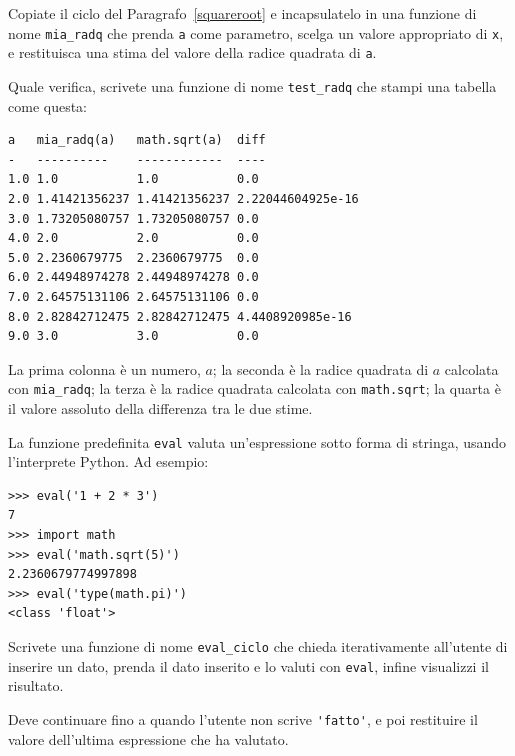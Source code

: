 \documentclass[10pt]{book}
\begin{document}
\begin{exercise}

Copiate il ciclo del Paragrafo~\ref{squareroot} e incapsulatelo in una funzione
di nome \verb"mia_radq" che prenda {\tt a} come parametro, scelga un valore appropriato di {\tt x}, e restituisca una stima del valore della radice quadrata di {\tt a}.  

Quale verifica, scrivete una funzione di nome \verb"test_radq" che stampi una tabella come questa:

\begin{verbatim}
a   mia_radq(a)   math.sqrt(a)  diff
-   ----------    ------------  ----
1.0 1.0           1.0           0.0
2.0 1.41421356237 1.41421356237 2.22044604925e-16
3.0 1.73205080757 1.73205080757 0.0
4.0 2.0           2.0           0.0
5.0 2.2360679775  2.2360679775  0.0
6.0 2.44948974278 2.44948974278 0.0
7.0 2.64575131106 2.64575131106 0.0
8.0 2.82842712475 2.82842712475 4.4408920985e-16
9.0 3.0           3.0           0.0
\end{verbatim}
%
La prima colonna è un numero, $a$; la seconda è la radice quadrata di $a$ calcolata con \verb"mia_radq"; la terza è la radice quadrata calcolata con {\tt math.sqrt}; la quarta è il valore assoluto della differenza tra le due stime.
\end{exercise}

\vspace{0.2in}
\begin{exercise}

La funzione predefinita {\tt eval} valuta un'espressione sotto forma di stringa, usando l'interprete Python. Ad esempio:

\begin{verbatim}
>>> eval('1 + 2 * 3')
7
>>> import math
>>> eval('math.sqrt(5)')
2.2360679774997898
>>> eval('type(math.pi)')
<class 'float'>
\end{verbatim}
%
Scrivete una funzione di nome \verb"eval_ciclo" che chieda iterativamente all'utente di inserire un dato, prenda il dato inserito e lo valuti con {\tt eval}, infine visualizzi il risultato.

Deve continuare fino a quando l'utente non scrive \verb"'fatto'", e poi restituire il valore dell'ultima espressione che ha valutato.

\end{exercise}
\end{document}
